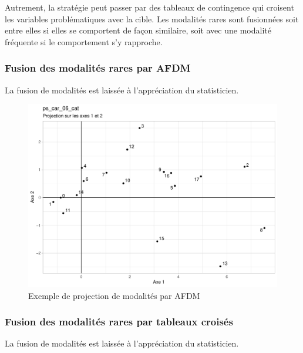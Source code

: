 \documentclass[french]{article}
\begin{document}
\begin{multicols}{2}
Autrement, la stratégie peut passer par des tableaux de contingence qui croisent les variables problématiques avec la cible. Les modalités rares sont fusionnées soit entre elles si elles se comportent de façon similaire, soit avec une modalité fréquente si le comportement s'y rapproche.

\subsubsection{Fusion des modalités rares par AFDM}

La fusion de modalités est laissée à l'appréciation du statisticien.

\begin{figure}[H] \centering
  \includegraphics[width = \columnwidth]{img/ex_afdm}
  \caption{Exemple de projection de modalités par AFDM}
\end{figure}

\subsubsection{Fusion des modalités rares par tableaux croisés}

La fusion de modalités est laissée à l'appréciation du statisticien.


\end{multicols}
\end{document}
